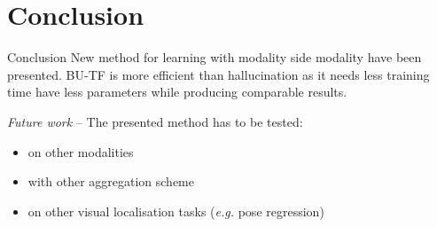 \section{Conclusion}

\label{subsec:conlusion}

\begin{frame}{Conclusion}
	\vfill
	New method for learning with modality side modality have been presented. BU-TF is more efficient than hallucination as it needs less training time have less parameters while producing comparable results.
	\vfill
	\uncover<2->
	{


		\textit{Future work} -- The presented method has to be tested:
		\begin{itemize}
			\item<2-> on other modalities
			\item<3-> with other aggregation scheme
			\item<4-> on other visual localisation tasks (\textit{e.g.} pose regression)
		\end{itemize}
	}	
\end{frame}
